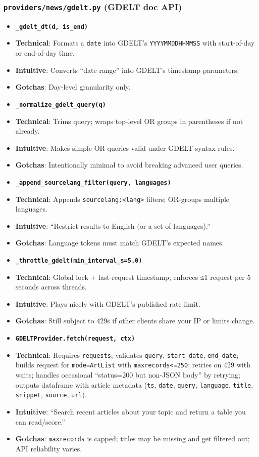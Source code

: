 \documentclass[11pt]{article}
\begin{document}
\subsubsection{\texttt{providers/news/gdelt.py} (GDELT doc API)}

\begin{itemize}[leftmargin=*,nosep]
\item \textbf{\texttt{\_gdelt\_dt(d, is\_end)}}
\item \textbf{Technical}: Formats a \texttt{date} into GDELT’s \texttt{YYYYMMDDHHMMSS} with start-of-day or end-of-day time.
\item \textbf{Intuitive}: Converts “date range” into GDELT’s timestamp parameters.
\item \textbf{Gotchas}: Day-level granularity only.
\item \textbf{\texttt{\_normalize\_gdelt\_query(q)}}
\item \textbf{Technical}: Trims query; wraps top-level OR groups in parentheses if not already.
\item \textbf{Intuitive}: Makes simple OR queries valid under GDELT syntax rules.
\item \textbf{Gotchas}: Intentionally minimal to avoid breaking advanced user queries.
\item \textbf{\texttt{\_append\_sourcelang\_filter(query, languages)}}
\item \textbf{Technical}: Appends \texttt{sourcelang:<lang>} filters; OR-groups multiple languages.
\item \textbf{Intuitive}: “Restrict results to English (or a set of languages).”
\item \textbf{Gotchas}: Language tokens must match GDELT’s expected names.
\item \textbf{\texttt{\_throttle\_gdelt(min\_interval\_s=5.0)}}
\item \textbf{Technical}: Global lock + last-request timestamp; enforces ≤1 request per 5 seconds across threads.
\item \textbf{Intuitive}: Plays nicely with GDELT’s published rate limit.
\item \textbf{Gotchas}: Still subject to 429s if other clients share your IP or limits change.
\item \textbf{\texttt{GDELTProvider.fetch(request, ctx)}}
\item \textbf{Technical}: Requires \texttt{requests}; validates \texttt{query}, \texttt{start\_date}, \texttt{end\_date}; builds request for \texttt{mode=ArtList} with \texttt{maxrecords<=250}; retries on 429 with waits; handles occasional “status=200 but non-JSON body” by retrying; outputs dataframe with article metadata (\texttt{ts}, \texttt{date}, \texttt{query}, \texttt{language}, \texttt{title}, \texttt{snippet}, \texttt{source}, \texttt{url}).
\item \textbf{Intuitive}: “Search recent articles about your topic and return a table you can read/score.”
\item \textbf{Gotchas}: \texttt{maxrecords} is capped; titles may be missing and get filtered out; API reliability varies.
\end{itemize}
\end{document}
